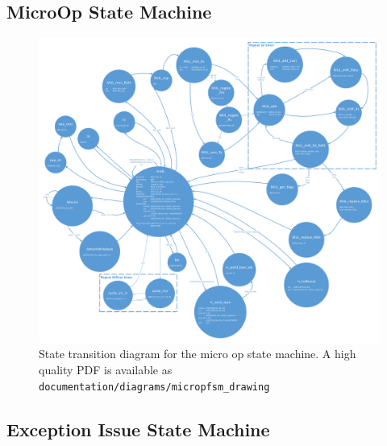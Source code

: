 \subsection{MicroOp State Machine}\label{sec:uop}


\begin{figure}[h!]
\centering
\includegraphics[width=\textwidth]{./diagrams/micropfsm_drawing.pdf}
\caption{State transition diagram for the micro op state machine. A high quality PDF is available as \texttt{documentation/diagrams/micropfsm\_drawing}}
\label{fig:uopdiagram}
\end{figure}

\subsection{Exception Issue State Machine}
